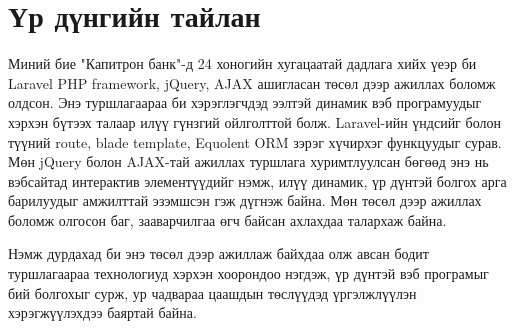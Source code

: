\section{Үр дүнгийн тайлан}
Миний бие "Капитрон банк"-д 24 хоногийн хугацаатай дадлага хийх үеэр би Laravel PHP framework, jQuery, AJAX ашигласан төсөл дээр ажиллах боломж олдсон. Энэ туршлагаараа би хэрэглэгчдэд ээлтэй динамик вэб програмуудыг хэрхэн бүтээх талаар илүү гүнзгий ойлголттой болж. Laravel-ийн үндсийг болон түүний route, blade template, Equolent ORM зэрэг хүчирхэг функцуудыг сурав. Мөн jQuery болон AJAX-тай ажиллах туршлага хуримтлуулсан бөгөөд энэ нь вэбсайтад интерактив элементүүдийг нэмж, илүү динамик, үр дүнтэй болгох арга барилуудыг амжилттай эзэмшсэн гэж дүгнэж байна. Мөн төсөл дээр ажиллах боломж олгосон баг, зааварчилгаа өгч байсан ахлахдаа талархаж байна.

\quad Нэмж дурдахад би энэ төсөл дээр ажиллаж байхдаа олж авсан бодит туршлагаараа технологиуд хэрхэн хоорондоо нэгдэж, үр дүнтэй вэб програмыг бий болгохыг сурж, ур чадвараа цаашдын төслүүдэд үргэлжлүүлэн хэрэгжүүлэхдээ баяртай байна.